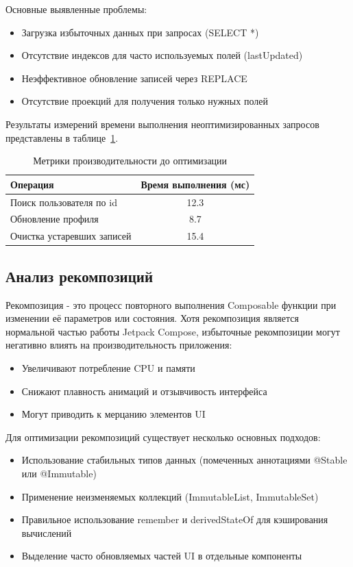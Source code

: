 \documentclass[14pt, russian]{scrartcl}
\begin{document}
Основные выявленные проблемы:
\begin{itemize}
\item Загрузка избыточных данных при запросах (SELECT *)
\item Отсутствие индексов для часто используемых полей (lastUpdated)
\item Неэффективное обновление записей через REPLACE
\item Отсутствие проекций для получения только нужных полей
\end{itemize}

Результаты измерений времени выполнения неоптимизированных запросов представлены в таблице~\ref{tab:db-metrics-before}.

\begin{table}[!htb]
\caption{Метрики производительности до оптимизации}
\vspace{-0.3cm}
\label{tab:db-metrics-before}
\begin{center}
\begin{tabular}{|l|c|}
\hline
\textbf{Операция} & \textbf{Время выполнения (мс)} \\
\hline
Поиск пользователя по id & 12.3 \\
\hline
Обновление профиля & 8.7 \\
\hline
Очистка устаревших записей & 15.4 \\
\hline
\end{tabular}
\end{center}
\end{table}

\subsection{Анализ рекомпозиций}\label{sect:recomposition-analysis}

Рекомпозиция - это процесс повторного выполнения Composable функции при изменении её параметров или состояния. Хотя рекомпозиция является нормальной частью работы Jetpack Compose, избыточные рекомпозиции могут негативно влиять на производительность приложения:
\begin{itemize}
\item Увеличивают потребление CPU и памяти
\item Снижают плавность анимаций и отзывчивость интерфейса
\item Могут приводить к мерцанию элементов UI
\end{itemize}

Для оптимизации рекомпозиций существует несколько основных подходов:
\begin{itemize}
\item Использование стабильных типов данных (помеченных аннотациями @Stable или @Immutable)
\item Применение неизменяемых коллекций (ImmutableList, ImmutableSet)
\item Правильное использование remember и derivedStateOf для кэширования вычислений
\item Выделение часто обновляемых частей UI в отдельные компоненты
\end{itemize}
\end{document}
